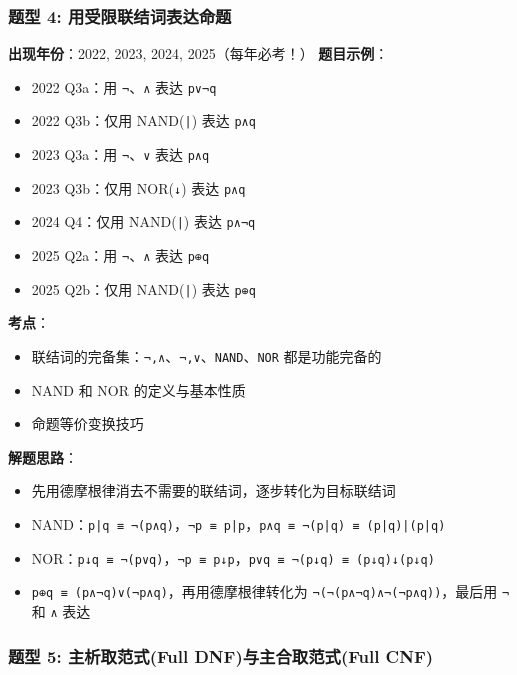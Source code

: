 \documentclass[10pt,a4paper,openany]{ctexbook}
\theoremstyle{definition}
\theoremstyle{remark}
\begin{document}
\subsubsection{题型 4: 用受限联结词表达命题}

\textbf{出现年份}：2022, 2023, 2024, 2025（每年必考！）
\textbf{题目示例}：
\begin{itemize}
\item 2022 Q3a：用 \texttt{¬}、\texttt{∧} 表达 \texttt{p∨¬q}
\item 2022 Q3b：仅用 NAND(\texttt{|}) 表达 \texttt{p∧q}
\item 2023 Q3a：用 \texttt{¬}、\texttt{∨} 表达 \texttt{p∧q}
\item 2023 Q3b：仅用 NOR(\texttt{↓}) 表达 \texttt{p∧q}
\item 2024 Q4：仅用 NAND(\texttt{|}) 表达 \texttt{p∧¬q}
\item 2025 Q2a：用 \texttt{¬}、\texttt{∧} 表达 \texttt{p⊕q}
\item 2025 Q2b：仅用 NAND(\texttt{|}) 表达 \texttt{p⊕q}

\end{itemize}

\textbf{考点}：
\begin{itemize}
\item 联结词的完备集：\texttt{{¬,∧}}、\texttt{{¬,∨}}、\texttt{{NAND}}、\texttt{{NOR}} 都是功能完备的
\item NAND 和 NOR 的定义与基本性质
\item 命题等价变换技巧

\end{itemize}

\textbf{解题思路}：
\begin{itemize}
\item 先用德摩根律消去不需要的联结词，逐步转化为目标联结词
\item NAND：\texttt{p|q ≡ ¬(p∧q)}，\texttt{¬p ≡ p|p}，\texttt{p∧q ≡ ¬(p|q) ≡ (p|q)|(p|q)}
\item NOR：\texttt{p↓q ≡ ¬(p∨q)}，\texttt{¬p ≡ p↓p}，\texttt{p∨q ≡ ¬(p↓q) ≡ (p↓q)↓(p↓q)}
\item \texttt{p⊕q ≡ (p∧¬q)∨(¬p∧q)}，再用德摩根律转化为 \texttt{¬(¬(p∧¬q)∧¬(¬p∧q))}，最后用 \texttt{¬} 和 \texttt{∧} 表达

\end{itemize}

\vspace{-2pt}

\subsubsection{题型 5: 主析取范式(Full DNF)与主合取范式(Full CNF)}
\end{document}
